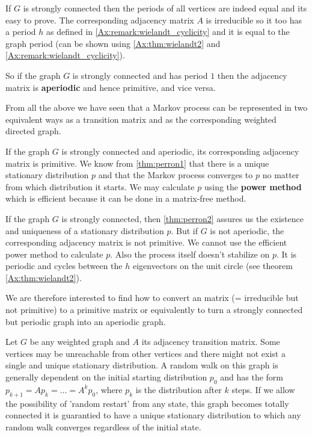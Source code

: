 \begin{remark}
\label{remark:periods}
If $G$ is strongly connected then the periods of all vertices are indeed equal
and its easy to prove. The corresponding adjacency matrix $A$ is irreducible so
it too has a period $h$ as defined in \ref{Ax:remark:wielandt_cyclicity} and it is
equal to the graph period (can be shown using \ref{Ax:thm:wielandt2} and
\ref{Ax:remark:wielandt_cyclicity}).

So if the graph $G$ is strongly connected and has period $1$
then the adjacency matrix is \textbf{aperiodic} and hence primitive, and vice versa. 
\end{remark}

From all the above we have seen that a Markov process can be represented in two
equivalent ways \textemdash as a transition matrix  and as the 
corresponding weighted directed graph.

If the graph $G$ is strongly connected and aperiodic, its corresponding
adjacency matrix is primitive. We know from \ref{thm:perron1} that there is a
unique stationary distribution $p$ and that the Markov process converges to $p$ no
matter from which distribution it starts. We may calculate $p$ using the
\textbf{power
method} which is efficient because it can be done in a matrix-free method. 

If the graph $G$ is strongly connected, then \ref{thm:perron2} assures us the
existence and uniqueness of a stationary distribution $p$. But if $G$ is not
aperiodic, the corresponding adjacency matrix is not primitive. We cannot use
the efficient power method to calculate $p$. Also the process itself doesn't
stabilize on $p$. It is periodic and cycles between the $h$ eigenvectors on
the unit circle (see theorem \ref{Ax:thm:wielandt2}). 

We are therefore interested to find how to convert an 
matrix (= irreducible but not primitive)
to a primitive matrix or equivalently to turn a strongly connected but periodic graph
into an aperiodic graph.

Let $G$ be any weighted graph and $A$ its adjacency transition matrix. Some vertices may
be unreachable from other vertices and there might not exist a single and
unique stationary distribution.
A random walk on this graph is generally
dependent on the initial starting distribution $p_0$ and has the
form $p_{k+1} = Ap_k = \dots = A^k p_0$, where $p_k$ is the
distribution after $k$ steps.
If we allow the possibility of 'random restart' from any state, this
graph becomes totally connected it is guarantied to have a unique stationary
distribution to which any random walk converges regardless of the initial state.

